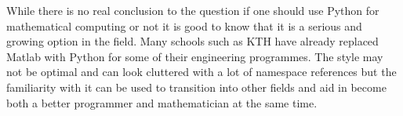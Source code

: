 \documentclass{article}
\begin{document}
While there is no real conclusion to the question if one should use Python for mathematical computing or not it is good to know that
it is a serious and growing option in the field. Many schools such as KTH have already replaced Matlab with Python for some of their
engineering programmes. The style may not be optimal and can look cluttered with a lot of namespace references but the familiarity with
it can be used to transition into other fields and aid in become both a better programmer and mathematician at the same time.
\end{document}
